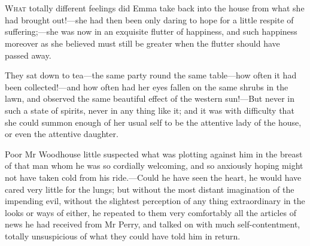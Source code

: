\chapter[Chapter \thechapter]{}
\lettrine[lines=4,lraise=0.3]{W}{hat} totally different feelings did Emma take back into the house from what she had brought out!—she had then been only daring to hope for a little respite of suffering;—she was now in an exquisite flutter of happiness, and such happiness moreover as she believed must still be greater when the flutter should have passed away.

They sat down to tea—the same party round the same table—how often it had been collected!—and how often had her eyes fallen on the same shrubs in the lawn, and observed the same beautiful effect of the western sun!—But never in such a state of spirits, never in any thing like it; and it was with difficulty that she could summon enough of her usual self to be the attentive lady of the house, or even the attentive daughter.

Poor Mr Woodhouse little suspected what was plotting against him in the breast of that man whom he was so cordially welcoming, and so anxiously hoping might not have taken cold from his ride.—Could he have seen the heart, he would have cared very little for the lungs; but without the most distant imagination of the impending evil, without the slightest perception of any thing extraordinary in the looks or ways of either, he repeated to them very comfortably all the articles of news he had received from Mr Perry, and talked on with much self-contentment, totally unsuspicious of what they could have told him in return.

